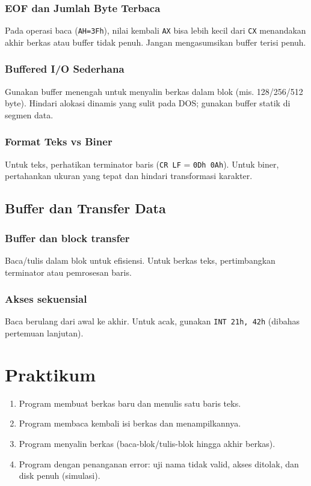 \subsubsection{EOF dan Jumlah Byte Terbaca}
Pada operasi baca (\texttt{AH=3Fh}), nilai kembali \texttt{AX} bisa lebih kecil dari \texttt{CX} menandakan akhir berkas atau buffer tidak penuh. Jangan mengasumsikan buffer terisi penuh. 
\subsubsection{Buffered I/O Sederhana}
Gunakan buffer menengah untuk menyalin berkas dalam blok (mis. 128/256/512 byte). Hindari alokasi dinamis yang sulit pada DOS; gunakan buffer statik di segmen data. 
\subsubsection{Format Teks vs Biner}
Untuk teks, perhatikan terminator baris (\texttt{CR LF} = \texttt{0Dh 0Ah}). Untuk biner, pertahankan ukuran yang tepat dan hindari transformasi karakter. 

\subsection{Buffer dan Transfer Data}
\subsubsection{Buffer dan block transfer}
Baca/tulis dalam blok untuk efisiensi. Untuk berkas teks, pertimbangkan terminator atau pemrosesan baris.

\subsubsection{Akses sekuensial}
Baca berulang dari awal ke akhir. Untuk acak, gunakan \texttt{INT 21h, 42h} (dibahas pertemuan lanjutan).

\section{Praktikum}
\begin{enumerate}
  \item Program membuat berkas baru dan menulis satu baris teks.
  \item Program membaca kembali isi berkas dan menampilkannya.
  \item Program menyalin berkas (baca-blok/tulis-blok hingga akhir berkas).
  \item Program dengan penanganan error: uji nama tidak valid, akses ditolak, dan disk penuh (simulasi).
\end{enumerate}

